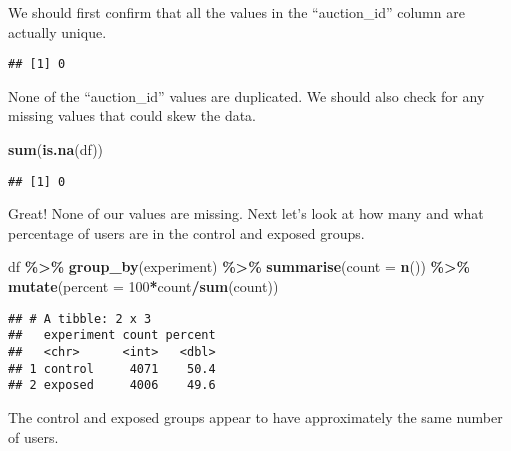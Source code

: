 \documentclass[
]{article}
\newenvironment{Shaded}{\begin{snugshade}}{\end{snugshade}}
\newcommand{\AttributeTok}[1]{\textcolor[rgb]{0.13,0.29,0.53}{#1}}
\newcommand{\DecValTok}[1]{\textcolor[rgb]{0.00,0.00,0.81}{#1}}
\newcommand{\FunctionTok}[1]{\textcolor[rgb]{0.13,0.29,0.53}{\textbf{#1}}}
\newcommand{\NormalTok}[1]{#1}
\newcommand{\SpecialCharTok}[1]{\textcolor[rgb]{0.81,0.36,0.00}{\textbf{#1}}}
\begin{document}
We should first confirm that all the values in the ``auction\_id''
column are actually unique.

\begin{Shaded}
\end{Shaded}

\begin{verbatim}
## [1] 0
\end{verbatim}

None of the ``auction\_id'' values are duplicated. We should also check
for any missing values that could skew the data.

\begin{Shaded}
\begin{Highlighting}[]
\FunctionTok{sum}\NormalTok{(}\FunctionTok{is.na}\NormalTok{(df))}
\end{Highlighting}
\end{Shaded}

\begin{verbatim}
## [1] 0
\end{verbatim}

Great! None of our values are missing. Next let's look at how many and
what percentage of users are in the control and exposed groups.

\begin{Shaded}
\begin{Highlighting}[]
\NormalTok{df }\SpecialCharTok{\%\textgreater{}\%}
  \FunctionTok{group\_by}\NormalTok{(experiment) }\SpecialCharTok{\%\textgreater{}\%}
  \FunctionTok{summarise}\NormalTok{(}\AttributeTok{count =} \FunctionTok{n}\NormalTok{()) }\SpecialCharTok{\%\textgreater{}\%}
  \FunctionTok{mutate}\NormalTok{(}\AttributeTok{percent =} \DecValTok{100}\SpecialCharTok{*}\NormalTok{count}\SpecialCharTok{/}\FunctionTok{sum}\NormalTok{(count))}
\end{Highlighting}
\end{Shaded}

\begin{verbatim}
## # A tibble: 2 x 3
##   experiment count percent
##   <chr>      <int>   <dbl>
## 1 control     4071    50.4
## 2 exposed     4006    49.6
\end{verbatim}

The control and exposed groups appear to have approximately the same
number of users.
\end{document}
